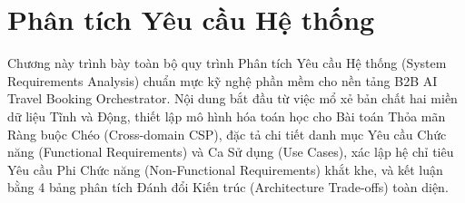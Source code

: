 \chapter{Phân tích Yêu cầu Hệ thống}
\label{chap:yeu_cau_he_thong}

Chương này trình bày toàn bộ quy trình Phân tích Yêu cầu Hệ thống (System Requirements Analysis) chuẩn mực kỹ nghệ phần mềm cho nền tảng B2B AI Travel Booking Orchestrator. Nội dung bắt đầu từ việc mổ xẻ bản chất hai miền dữ liệu Tĩnh và Động, thiết lập mô hình hóa toán học cho Bài toán Thỏa mãn Ràng buộc Chéo (Cross-domain CSP), đặc tả chi tiết danh mục Yêu cầu Chức năng (Functional Requirements) và Ca Sử dụng (Use Cases), xác lập hệ chỉ tiêu Yêu cầu Phi Chức năng (Non-Functional Requirements) khắt khe, và kết luận bằng 4 bảng phân tích Đánh đổi Kiến trúc (Architecture Trade-offs) toàn diện.






